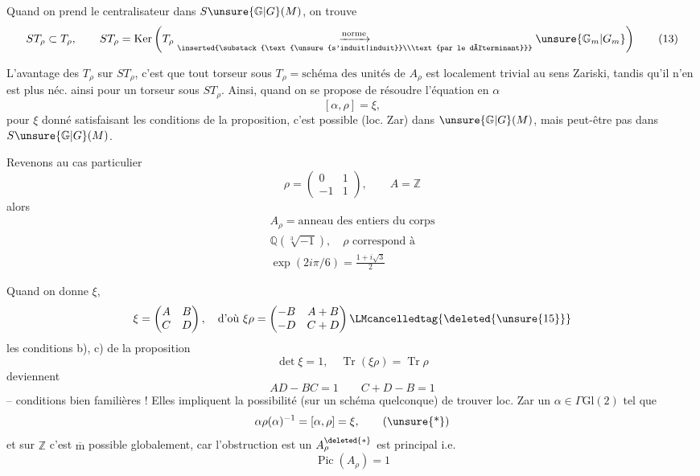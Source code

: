 Quand on prend le centralisateur dans
$S\unsure{\mathbb G|G}(M)$, on trouve
\[
ST_\rho\subset T_\rho,\qquad
ST_\rho=\operatorname{Ker}\left(
T_\rho
\underset{\inserted{\substack{\text{\unsure{s'induit|induit}}\\\text{par le déterminant}}}}
{\xrightarrow{\text{norme}}}\unsure{\mathbb G_m|G_m}\right)
\tag{13}
\]

L'avantage des $T_\rho$ sur $ST_\rho$, c'est que
tout torseur sous $T_\rho=\text{schéma des unités de }A_\rho$
est localement trivial au sens Zariski, tandis
qu'il n'en est plus néc. ainsi pour
un torseur sous $ST_\rho$. Ainsi, quand
on se propose de résoudre l'équation en $\alpha$
\[
[\alpha,\rho]=\xi,
\]
pour $\xi$ donné satisfaisant les conditions de la
proposition, c'est possible (loc. Zar) dans
$\unsure{\mathbb G|G}(M)$, mais peut-être pas dans $S\unsure{\mathbb G|G}(M)$.



Revenons au cas particulier
\[
\rho=\begin{pmatrix}0&1\\-1&1\end{pmatrix},\qquad A=\mathbb Z
\]
alors
\[
\begin{gathered}
A_\rho=\text{anneau des entiers du corps}\\
\mathbb Q(\sqrt[3]{-1}),\quad \rho\text{ correspond à}\\
\exp(2i\pi/6)=\frac{1+i\sqrt3}{2}
\end{gathered}
\tag{14}
\]

Quand on  donne $\xi$, 
\[
\xi=\begin{pmatrix}A&B\\C&D\end{pmatrix},\quad
\text{d'où }\xi\rho=
\begin{pmatrix}-B&A+B\\-D&C+D\end{pmatrix}
\LMcancelledtag{\deleted{\unsure{15}}}
\]
les conditions  b), c) de la proposition
\[
\det\xi=1,\quad \operatorname{Tr}(\xi\rho)=\operatorname{Tr}\rho
\]
 deviennent
\[
AD-BC=1\qquad C+D-B=1
\tag{16}
\]
-- conditions bien familières ! Elles impliquent
la possibilité  (sur un schéma quelconque)
de trouver loc. Zar un $\alpha\in\Gamma\mathrm{Gl}(2)$
tel que 
\[
\alpha\rho(\alpha)^{-1}=[\alpha,\rho]=\xi,
\tag{\unsure{*}}
\]
et sur $\mathbb Z$ c'est $\overline{\mathrm m}$ possible globalement,
car l'obstruction est un 
$A_\rho^{\deleted{*}}$ est principal  i.e. 
\[
\operatorname{Pic}(A_\rho)=1
\tag{17}
\]

